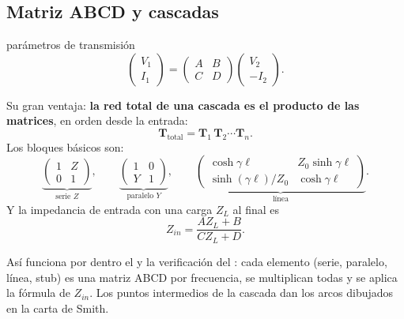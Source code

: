 \subsection{Matriz ABCD y cascadas}
\begin{definicion}{parámetros de transmisión}
\begin{equation}
  \begin{pmatrix} V_1 \\ I_1 \end{pmatrix} = \begin{pmatrix} A & B \\ C & D \end{pmatrix}\begin{pmatrix} V_2 \\ -I_2 \end{pmatrix}.
\end{equation}
\begin{donde}
\end{donde}
\end{definicion}
Su gran ventaja: \textbf{la red total de una cascada es el producto de las matrices}, en orden desde la entrada:
\begin{equation}
  \mathbf T_{\text{total}} = \mathbf T_1\,\mathbf T_2\cdots\mathbf T_n .
\end{equation}
Los bloques básicos son:
\begin{equation}
  \underbrace{\begin{pmatrix} 1 & Z \\ 0 & 1\end{pmatrix}}_{\text{serie } Z}, \qquad
  \underbrace{\begin{pmatrix} 1 & 0 \\ Y & 1\end{pmatrix}}_{\text{paralelo } Y}, \qquad
  \underbrace{\begin{pmatrix} \cosh\gamma\ell & Z_0\sinh\gamma\ell \\ \sinh(\gamma\ell)/Z_0 & \cosh\gamma\ell\end{pmatrix}}_{\text{línea}} .
\end{equation}
Y la impedancia de entrada con una carga $Z_L$ al final es
\begin{equation}
  Z_{in} = \frac{A Z_L + B}{C Z_L + D}.
\end{equation}
\begin{enlaapp}
Así funciona por dentro el  y la verificación del : cada elemento (serie, paralelo, línea, stub)
es una matriz ABCD por frecuencia, se multiplican todas y se aplica la fórmula de $Z_{in}$. Los puntos intermedios de la cascada dan los
arcos dibujados en la carta de Smith.
\end{enlaapp}

